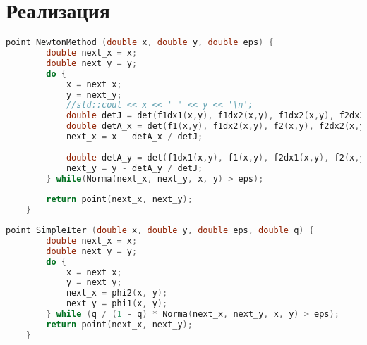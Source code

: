 \section*{Реализация}

\begin{lstlisting}[language=C++]
    point NewtonMethod (double x, double y, double eps) {
        double next_x = x;
        double next_y = y;
        do {
            x = next_x;
            y = next_y;
            //std::cout << x << ' ' << y << '\n';
            double detJ = det(f1dx1(x,y), f1dx2(x,y), f1dx2(x,y), f2dx2(x,y));
            double detA_x = det(f1(x,y), f1dx2(x,y), f2(x,y), f2dx2(x,y));
            next_x = x - detA_x / detJ;
    
            double detA_y = det(f1dx1(x,y), f1(x,y), f2dx1(x,y), f2(x,y));
            next_y = y - detA_y / detJ;
        } while(Norma(next_x, next_y, x, y) > eps);
    
        return point(next_x, next_y);
    }
\end{lstlisting}

\begin{lstlisting}[language=C++]
    point SimpleIter (double x, double y, double eps, double q) {
        double next_x = x;
        double next_y = y;
        do {
            x = next_x;
            y = next_y;
            next_x = phi2(x, y);
            next_y = phi1(x, y);
        } while (q / (1 - q) * Norma(next_x, next_y, x, y) > eps);
        return point(next_x, next_y);
    }
\end{lstlisting}

\pagebreak